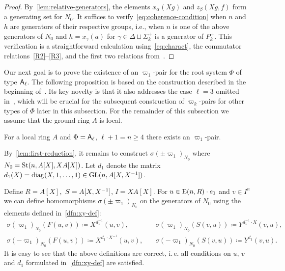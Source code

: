 \begin{proof}
    By~\cref{lem:relative-generators}, the elements $x_\alpha(Xg)$ and $z_\beta(Xg, f)$ form a generating set for \( N_0 \).
    It suffices to verify~\eqref{eq:coherence-condition} when \( n \) and \( h \) are generators of their respective groups,
     i.e., when \( n \) is one of the above generators of \( N_0 \) and \( h = x_\gamma(a) \) for \( \gamma \in \Delta \sqcup \Sigma^+_k \) is a generator of \( P_k^+ \).
    This verification is a straightforward calculation using~\eqref{eq:charact}, the commutator relations~\eqref{R2}--\eqref{R3}, and the first two relations from~\cite[Lemma~9]{S15}.
\end{proof}

Our next goal is to prove the existence of an $\varpi_1$-pair for the root system $\Phi$ of type $\mathsf{A}_\ell$.
The following proposition is based on the construction described in the beginning of~\cite[\S~3]{Tu83}.
Its key novelty is that it also addresses the case \( \ell = 3 \) omitted in~\cite{Tu83}, which will be crucial for the subsequent construction of \( \varpi_k \)-pairs for other types of \( \Phi \) later in this subsection.
For the remainder of this subsection we assume that the ground ring $A$ is local.

\begin{prop} \label{prop:sigma-construction}
    For a local ring $A$ and $\Phi = \mathsf{A}_\ell$, $\ell + 1 = n \geq 4$ there exists an $\varpi_1$-pair.
\end{prop}

By~\eqref{lem:first-reduction}, it remains to construct $\sigma(\pm\varpi_1)_{N_0}$ where $N_0 = \operatorname{St}(n, A[X], XA[X])$.
Let \( d_1 \) denote the matrix $d_1(X) = \mathrm{diag}(X, 1, \ldots, 1) \in \operatorname{GL}(n, A[X, X^{-1}])$.

Define $R = A[X],$ $S = A[X, X^{-1}]$, $I = XA[X].$
For $u \in \operatorname{E}(n, R) \cdot e_1$ and $v \in I^n$ we can define homomorphisms $\sigma(\pm\varpi_1)_{N_0}$ on the generators of $N_{0}$ using the elements defined in~\cref{dfn:xy-def}:
\begin{align}
    \sigma(\varpi_1)_{N_0} \left(F(u, v)\right) \coloneqq X^{d_1^{-1}}(u, v), & \quad \sigma(\varpi_1)_{N_0} \left(S(v, u)\right) \coloneqq Y^{d_1^{-1} \cdot X}(v, u), \label{eq:def-sigma-1} \\
    \sigma(-\varpi_1)_{N_0} \left(F(u, v)\right) \coloneqq X^{d_1 \cdot X^{-1}}(u, v),& \quad \sigma(-\varpi_1)_{N_0} \left(S(v, u)\right) \coloneqq Y^{d_1}(v, u). \label{eq:def-sigma-2}
\end{align}
It is easy to see that the above definitions are correct, i.\,e. all conditions on $u$, $v$ and $d_1$ formulated in~\cref{dfn:xy-def} are satisfied.

